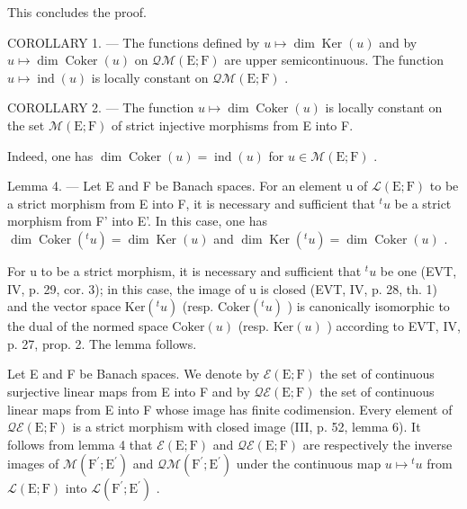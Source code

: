 This concludes the proof.

COROLLARY 1. --- The functions defined by \(u \mapsto \dim \operatorname{Ker}(u)\) and by \(u \mapsto \dim \operatorname{Coker}(u)\) on \(\mathcal{Q}\mathcal{M}(\mathrm{E};\mathrm{F})\) are upper semicontinuous. The function \(u \mapsto \operatorname{ind}(u)\) is locally constant on \(\mathcal{Q}\mathcal{M}(\mathrm{E};\mathrm{F})\) .

COROLLARY 2. --- The function \(u \mapsto \dim \operatorname{Coker}(u)\) is locally constant on the set \(\mathcal{M}(\mathrm{E};\mathrm{F})\) of strict injective morphisms from E into F.

Indeed, one has \(\dim \operatorname{Coker}(u) = \operatorname{ind}(u)\) for \(u \in \mathcal{M}(\mathrm{E};\mathrm{F})\) .

Lemma 4. --- Let E and F be Banach spaces. For an element u of \(\mathcal{L}(\mathrm{E};\mathrm{F})\) to be a strict morphism from E into F, it is necessary and sufficient that \(^{t}u\) be a strict morphism from F' into E'. In this case, one has \(\dim \operatorname{Coker}(^{t}u)=\dim\operatorname{Ker}(u)\) and \(\dim\operatorname{Ker}(^{t}u)=\dim\operatorname{Coker}(u)\) .

For u to be a strict morphism, it is necessary and sufficient that \(^{t}u\) be one (EVT, IV, p. 29, cor. 3); in this case, the image of u is closed (EVT, IV, p. 28, th. 1) and the vector space \(\mathrm{Ker}(^{t}u)\) (resp. \(\mathrm{Coker}(^{t}u)\) ) is canonically isomorphic to the dual of the normed space \(\mathrm{Coker}(u)\) (resp. \(\mathrm{Ker}(u)\) ) according to EVT, IV, p. 27, prop. 2. The lemma follows.

Let E and F be Banach spaces. We denote by \(\mathcal{E}(\mathrm{E};\mathrm{F})\) the set of continuous surjective linear maps from E into F and by \(\mathcal{Q}\mathcal{E}(\mathrm{E};\mathrm{F})\) the set of continuous linear maps from E into F whose image has finite codimension. Every element of \(\mathcal{Q}\mathcal{E}(\mathrm{E};\mathrm{F})\) is a strict morphism with closed image (III, p. 52, lemma 6). It follows from lemma 4 that \(\mathcal{E}(\mathrm{E};\mathrm{F})\) and \(\mathcal{Q}\mathcal{E}(\mathrm{E};\mathrm{F})\) are respectively the inverse images of \(\mathcal{M}(\mathrm{F}^{\prime};\mathrm{E}^{\prime})\) and \(\mathcal{Q}\mathcal{M}(\mathrm{F}^{\prime};\mathrm{E}^{\prime})\) under the continuous map \(u\mapsto{}^{t}u\) from \(\mathcal{L}(\mathrm{E};\mathrm{F})\) into \(\mathcal{L}(\mathrm{F}^{\prime};\mathrm{E}^{\prime})\) .

